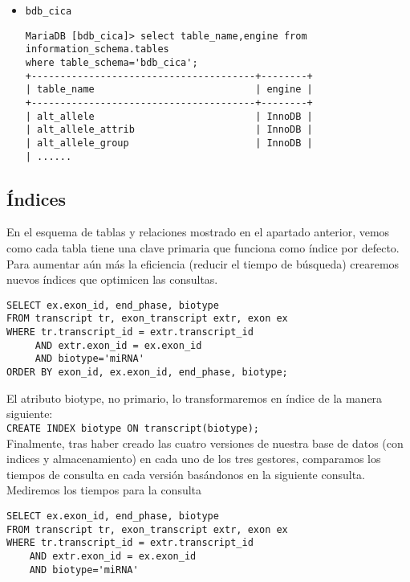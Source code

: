 \documentclass[12pt,a4paper]{article}
\begin{document}
\begin{itemize}
	\item \verb|bdb_cica|
	\begin{verbatim}
MariaDB [bdb_cica]> select table_name,engine from information_schema.tables 
where table_schema='bdb_cica';
+---------------------------------------+--------+
| table_name                            | engine |
+---------------------------------------+--------+
| alt_allele                            | InnoDB |
| alt_allele_attrib                     | InnoDB |
| alt_allele_group                      | InnoDB |
| ......
	\end{verbatim}
	
	
\end{itemize}





\subsection{Índices}  \label{pto32}

En el esquema de tablas y relaciones mostrado en el apartado anterior, vemos como cada tabla tiene una clave primaria que funciona como índice por defecto. Para aumentar aún más la eficiencia (reducir el tiempo de búsqueda) crearemos nuevos índices que optimicen las consultas. 


\begin{verbatim}
SELECT ex.exon_id, end_phase, biotype
FROM transcript tr, exon_transcript extr, exon ex
WHERE tr.transcript_id = extr.transcript_id 
     AND extr.exon_id = ex.exon_id 
     AND biotype='miRNA'
ORDER BY exon_id, ex.exon_id, end_phase, biotype;
\end{verbatim}

El atributo biotype, no primario, lo transformaremos en índice de la manera siguiente:\\

\verb|CREATE INDEX biotype ON transcript(biotype);|\\



Finalmente, tras haber creado las cuatro versiones de nuestra base de datos (con indices y almacenamiento) en cada  uno de los tres gestores, comparamos los tiempos de consulta en cada versión basándonos en la siguiente consulta. Mediremos los tiempos para la consulta

\begin{verbatim}
SELECT ex.exon_id, end_phase, biotype
FROM transcript tr, exon_transcript extr, exon ex
WHERE tr.transcript_id = extr.transcript_id 
    AND extr.exon_id = ex.exon_id 
    AND biotype='miRNA'
\end{verbatim}
\end{document}
